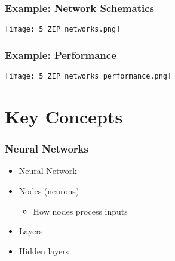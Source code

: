 \documentclass[mathserif]{beamer}
\begin{document}
\begin{frame}
  \frametitle{Example: Network Schematics}
  \texttt{[image: 5\_ZIP\_networks.png]}
\end{frame}

\begin{frame}
  \frametitle{Example: Performance}
  \texttt{[image: 5\_ZIP\_networks\_performance.png]}
\end{frame}


\section{Key Concepts}

\begin{frame}
  \frametitle{Neural Networks}
  \begin{itemize}
  \item Neural Network
  \item Nodes (neurons)
    \begin{itemize}
    \item How nodes process inputs
    \end{itemize}
  \item Layers
  \item Hidden layers
  \end{itemize}
\end{frame}
\end{document}
